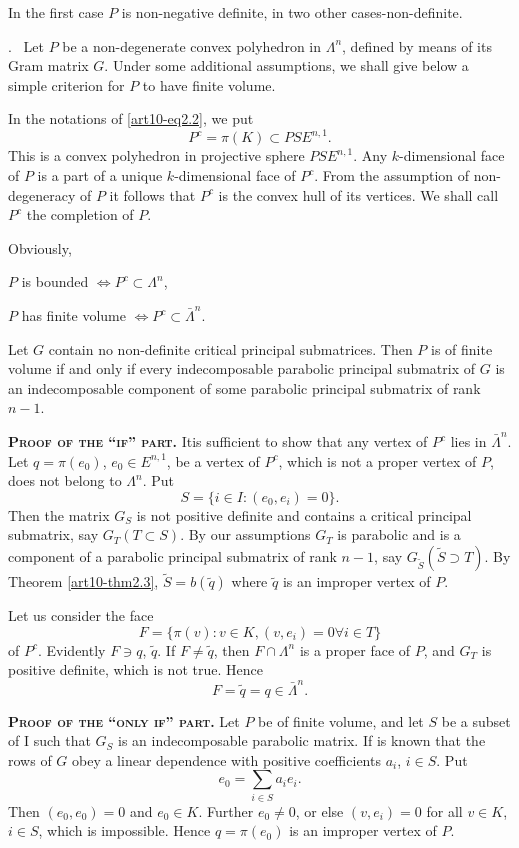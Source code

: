 In the first case $P$ is non-negative definite, in two other cases-non-definite.

.~ Let $P$ be a non-degenerate convex polyhedron in $\Lambda^n$, defined by means of its Gram matrix $G$. Under some additional assumptions, we shall give below a simple criterion for $P$ to have finite volume. 

In the notations of \ref{art10-eq2.2}, we put 
$$
P^c = \pi (K) \subset PSE^{n,1}.
$$
This is a convex polyhedron in projective sphere $PSE^{n,1}$. Any $k$-dimen\-sional face of $P$ is a part of a unique $k$-dimensional face of $P^c$. From the assumption of non-degeneracy of $P$ it follows that $P^c$ is the convex hull of its vertices. We shall call $P^c$ the completion of $P$.

Obviously,

$P$ is bounded $\Leftrightarrow P^c \subset \Lambda^n$,

$P$ has finite volume $\Leftrightarrow P^c \subset \bar{\Lambda}^n$.

\setcounter{theorem}{5}
\begin{theorem}\label{art10-thm2.6}
Let $G$ contain no non-definite critical principal submatrices. Then $P$ is of finite volume if and only if every indecomposable parabolic principal submatrix of $G$ is an indecomposable component of some parabolic principal submatrix of rank $n-1$.
\end{theorem}

\medskip
\textbf{\textsc{Proof of the ``if'' part.}} It\pageoriginale is sufficient to show that any vertex of $P^c$ lies in $\bar{\Lambda}^n$. Let $q = \pi (e_0)$, $e_0 \in E^{n,1}$, be a vertex of $P^c$, which is not a proper vertex of $P$, \ie does not belong to $\Lambda^n$. Put
$$
S = \{i \in I: (e_0, e_i) = 0\}.
$$
Then the matrix $G_S$ is not positive definite and contains a critical principal submatrix, say $G_T (T \subset S)$. By our assumptions $G_T$ is parabolic and is a component of a parabolic principal submatrix of rank $n-1$, say $G_{\tilde{S}} (\tilde{S} \supset T)$. By Theorem \ref{art10-thm2.3}, $\tilde{S} = b (\tilde{q})$ where $\tilde{q}$ is an improper vertex of $P$.

Let us consider the face
$$
F = \{\pi(v) : v \in K, (v, e_i) = 0 \forall i \in T\}
$$
of $P^c$. Evidently $F \ni q$, $\tilde{q}$. If $F \neq \tilde{q}$, then $F \cap \Lambda^n$ is a proper face of $P$, and $G_T$ is positive definite, which is not true. Hence
$$
F = \tilde{q} = q \in  \bar{\Lambda}^n.
$$

\medskip
\textbf{\textsc{Proof of the ``only if'' part.}} Let $P$ be of finite volume, and let $S$ be a subset of I such that $G_S$ is an indecomposable parabolic matrix. If is known \cite{art10-key1} that the rows of $G$ obey a linear dependence with positive coefficients $a_i$, $i \in S$. Put
$$
e_0 = \sum\limits_{i \in S} a_i e_i.
$$
Then $(e_0, e_0) =0$ and $e_0 \in K$. Further $e_0 \neq 0$, or else $(v, e_i) =0$ for all $v \in K$, $i\in S$, which is impossible. Hence $q = \pi (e_0)$ is an improper vertex of $P$.


